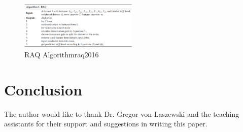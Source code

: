 \documentclass[sigconf]{acmart}
\begin{document}
\begin{figure}
\includegraphics[width=0.5\textwidth]{images/fig6.png}
\caption{RAQ Algorithm{raq2016}}
\end{figure}

\section{Conclusion}

    
\begin{acks}

The author would like to thank Dr. Gregor von Laszewski and the teaching assistants for their support and suggestions in writing this paper.

\end{acks}


 
\end{document}
